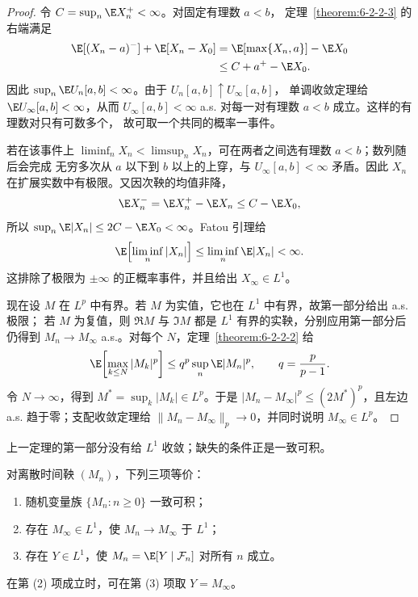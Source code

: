 \begin{proof}
令 $C=\sup_n\E X_n^+<\infty$。对固定有理数 $a<b$，
定理~\ref{theorem:6-2-2-3} 的右端满足
\begin{align*}
 \E[(X_n-a)^-]+\E[X_n-X_0]
 &=\E[\max\{X_n,a\}]-\E X_0\\
 &\le C+a^+-\E X_0.
\end{align*}
因此 $\sup_n\E U_n[a,b]<\infty$。由于 $U_n[a,b]\uparrow U_\infty[a,b]$，
单调收敛定理给 $\E U_\infty[a,b]<\infty$，从而
$U_\infty[a,b]<\infty$ a.s. 对每一对有理数 $a<b$ 成立。这样的有理数对只有可数多个，
故可取一个共同的概率一事件。

若在该事件上 $\liminf_nX_n<\limsup_nX_n$，可在两者之间选有理数 $a<b$；数列随后会完成
无穷多次从 $a$ 以下到 $b$ 以上的上穿，与 $U_\infty[a,b]<\infty$ 矛盾。因此
$X_n$ 在扩展实数中有极限。又因次鞅的均值非降，
\[
 \E X_n^- =\E X_n^+-\E X_n\le C-\E X_0,
\]
所以 $\sup_n\E|X_n|\le2C-\E X_0<\infty$。Fatou 引理给
\[
 \E\!\left[\liminf_n|X_n|\right]
 \le\liminf_n\E|X_n|<\infty.
\]
这排除了极限为 $\pm\infty$ 的正概率事件，并且给出
$X_\infty\in L^1$。

现在设 $M$ 在 $L^p$ 中有界。若 $M$ 为实值，它也在 $L^1$ 中有界，故第一部分给出 a.s. 极限；
若 $M$ 为复值，则 $\Re M$ 与 $\Im M$ 都是 $L^1$ 有界的实鞅，分别应用第一部分后仍得到
$M_n\to M_\infty$ a.s.。对每个 $N$，定理~\ref{theorem:6-2-2-2} 给
\[
 \E\!\left[\max_{k\le N}|M_k|^p\right]
 \le q^p\sup_n\E|M_n|^p,
 \qquad q=\frac{p}{p-1}.
\]
令 $N\to\infty$，得到 $M^*=\sup_k|M_k|\in L^p$。于是
$|M_n-M_\infty|^p\le(2M^*)^p$，且左边 a.s. 趋于零；支配收敛定理给
$\|M_n-M_\infty\|_p\to0$，并同时说明 $M_\infty\in L^p$。
\end{proof}

上一定理的第一部分没有给 $L^1$ 收敛；缺失的条件正是一致可积。

\begin{proposition}[UI、$L^1$ 收敛与闭合]\label{proposition:6-2-2-5}
对离散时间鞅 $(M_n)$，下列三项等价：
\begin{enumerate}
 \item 随机变量族 $\{M_n:n\ge0\}$ 一致可积；
 \item 存在 $M_\infty\in L^1$，使 $M_n\to M_\infty$ 于 $L^1$；
 \item 存在 $Y\in L^1$，使 $M_n=\E[Y\mid\mathcal F_n]$ 对所有 $n$ 成立。
\end{enumerate}
在第 (2) 项成立时，可在第 (3) 项取 $Y=M_\infty$。
\end{proposition}

